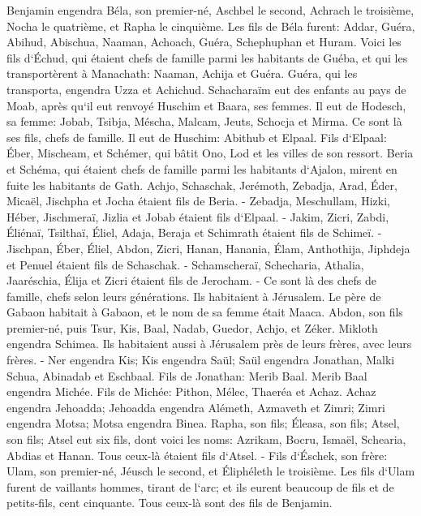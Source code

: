 \verse Benjamin engendra Béla, son premier-né, Aschbel le second, Achrach le troisième, 
\verse Nocha le quatrième, et Rapha le cinquième. 
\verse Les fils de Béla furent: Addar, Guéra, Abihud, 
\verse Abischua, Naaman, Achoach, 
\verse Guéra, Schephuphan et Huram. 
\verse Voici les fils d`Échud, qui étaient chefs de famille parmi les habitants de Guéba, et qui les transportèrent à Manachath: 
\verse Naaman, Achija et Guéra. Guéra, qui les transporta, engendra Uzza et Achichud. 
\verse Schacharaïm eut des enfants au pays de Moab, après qu`il eut renvoyé Huschim et Baara, ses femmes. 
\verse Il eut de Hodesch, sa femme: Jobab, Tsibja, Méscha, Malcam, 
\verse Jeuts, Schocja et Mirma. Ce sont là ses fils, chefs de famille. 
\verse Il eut de Huschim: Abithub et Elpaal. 
\verse Fils d`Elpaal: Éber, Mischeam, et Schémer, qui bâtit Ono, Lod et les villes de son ressort. 
\verse Beria et Schéma, qui étaient chefs de famille parmi les habitants d`Ajalon, mirent en fuite les habitants de Gath. 
\verse Achjo, Schaschak, Jerémoth, 
\verse Zebadja, Arad, Éder, 
\verse Micaël, Jischpha et Jocha étaient fils de Beria. - 
\verse Zebadja, Meschullam, Hizki, Héber, 
\verse Jischmeraï, Jizlia et Jobab étaient fils d`Elpaal. - 
\verse Jakim, Zicri, Zabdi, 
\verse Éliénaï, Tsilthaï, Éliel, 
\verse Adaja, Beraja et Schimrath étaient fils de Schimeï. - 
\verse Jischpan, Éber, Éliel, 
\verse Abdon, Zicri, Hanan, 
\verse Hanania, Élam, Anthothija, 
\verse Jiphdeja et Penuel étaient fils de Schaschak. - 
\verse Schamscheraï, Schecharia, Athalia, 
\verse Jaaréschia, Élija et Zicri étaient fils de Jerocham. - 
\verse Ce sont là des chefs de famille, chefs selon leurs générations. Ils habitaient à Jérusalem. 
\verse Le père de Gabaon habitait à Gabaon, et le nom de sa femme était Maaca. 
\verse Abdon, son fils premier-né, puis Tsur, Kis, Baal, Nadab, 
\verse Guedor, Achjo, et Zéker. 
\verse Mikloth engendra Schimea. Ils habitaient aussi à Jérusalem près de leurs frères, avec leurs frères. - 
\verse Ner engendra Kis; Kis engendra Saül; Saül engendra Jonathan, Malki Schua, Abinadab et Eschbaal. 
\verse Fils de Jonathan: Merib Baal. Merib Baal engendra Michée. 
\verse Fils de Michée: Pithon, Mélec, Thaeréa et Achaz. 
\verse Achaz engendra Jehoadda; Jehoadda engendra Alémeth, Azmaveth et Zimri; Zimri engendra Motsa; 
\verse Motsa engendra Binea. Rapha, son fils; Éleasa, son fils; Atsel, son fils; 
\verse Atsel eut six fils, dont voici les noms: Azrikam, Bocru, Ismaël, Schearia, Abdias et Hanan. Tous ceux-là étaient fils d`Atsel. - 
\verse Fils d`Éschek, son frère: Ulam, son premier-né, Jéusch le second, et Éliphéleth le troisième. 
\verse Les fils d`Ulam furent de vaillants hommes, tirant de l`arc; et ils eurent beaucoup de fils et de petits-fils, cent cinquante. Tous ceux-là sont des fils de Benjamin. 

